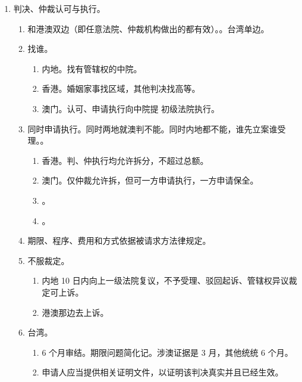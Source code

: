 \begin{enumerate}
\begin{enumerate}
\begin{kk}{新的成果}
\begin{enumerate}
                  \end{enumerate}
                \end{kk}
        \end{enumerate}
  \item 判决、仲裁认可与执行。
        \begin{enumerate}
          \item 和港澳双边（即任意法院、仲裁机构做出的都有效）。。台湾单边。
          \item 找谁。
                \begin{enumerate}
                  \item 内地。找有管辖权的中院。
                  \item 香港。婚姻家事找区域，其他判决找高等。
                  \item 澳门。认可、申请执行向中院提 \yjt 初级法院执行。
                \end{enumerate}
          \item 同时申请执行。同时两地就澳判不能。同时内地都不能，谁先立案谁受理。。
                \begin{enumerate}
                  \item 香港。判、仲执行均允许拆分，不超过总额。
                  \item 澳门。仅仲裁允许拆，但可一方申请执行，一方申请保全。
                  \item {}。
                  \item {}。
                \end{enumerate}
          \item 期限、程序、费用和方式依据被请求方法律规定。
          \item 不服裁定。
                \begin{enumerate}
                  \item 内地 10 日内向上一级法院复议，不予受理、驳回起诉、管辖权异议裁定可上诉。
                  \item 港澳那边去上诉。
                \end{enumerate}
          \item 台湾。
                \begin{enumerate}
                  \item 6 个月审结。期限问题简化记。涉澳证据是 3 月，其他统统 6 个月。
                  \item 申请人应当提供相关证明文件，以证明该判决真实并且已经生效。
                \end{enumerate}
        \end{enumerate}


\end{enumerate}
